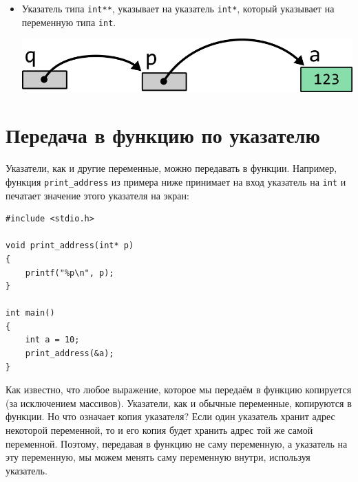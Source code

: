 \documentclass[10pt]{article}
\begin{document}
\begin{itemize}
\item Указатель типа \texttt{int**}, указывает на указатель \texttt{int*}, который указывает на переменную типа \texttt{int}.
\begin{center}
\includegraphics[scale=1]{../images/pointer_tasks/pointer_tasks_pointer_to_pointer.png}
\end{center}
\end{itemize}



\newpage



\newpage
\section*{Передача в функцию по указателю}
Указатели, как и другие переменные, можно передавать в функции.
Например, функция \texttt{print\_address} из примера ниже принимает на вход указатель на \texttt{int} и печатает значение этого указателя на экран:
\begin{lstlisting}
#include <stdio.h>

void print_address(int* p)
{
    printf("%p\n", p);
}

int main()
{
    int a = 10;
    print_address(&a);
}
\end{lstlisting}

Как известно, что любое выражение, которое мы передаём в функцию копируется (за исключением массивов). Указатели, как и обычные переменные, копируются в функции. Но что означает копия указателя? Если один указатель хранит адрес некоторой переменной, то и его копия будет хранить адрес той же самой переменной. Поэтому, передавая в функцию не саму переменную, а указатель на эту переменную, мы можем менять саму переменную внутри, используя указатель.
\end{document}
